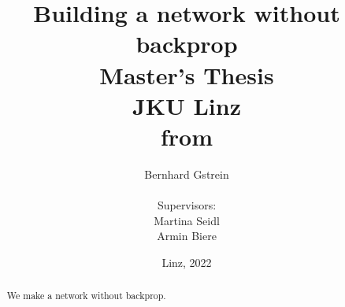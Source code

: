 \documentclass[a4paper,12pt]{article}
\begin{document}
%
    \title{Building a network without backprop\\
    \vspace{2em}
    Master's Thesis\\
    \vspace{2em}
    JKU Linz\\
    \vspace{1.5em}
    from}

    \author{
 	\LARGE Bernhard Gstrein\\
 	\vspace{.5em} \\
 	Supervisors:\\
 	Martina Seidl\\
 	Armin Biere\\
 	\vspace{1em}
	}
    
\date{Linz, 2022}

\maketitle
   
\begin{abstract}
\noindent We make a network without backprop.
\end{abstract}
   
\newpage
   
\tableofcontents
 
\newpage
    






\newpage



\end{document}
